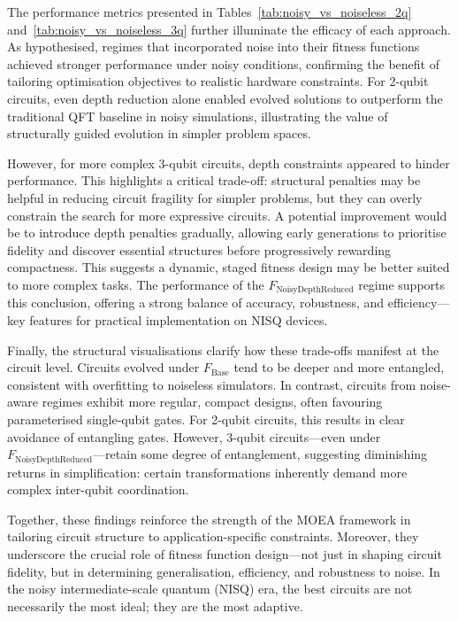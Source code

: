 \documentclass[11pt,a4paper]{article}
\begin{document}
The performance metrics presented in Tables~\ref{tab:noisy_vs_noiseless_2q} and~\ref{tab:noisy_vs_noiseless_3q} further illuminate the efficacy of each approach. As hypothesised, regimes that incorporated noise into their fitness functions achieved stronger performance under noisy conditions, confirming the benefit of tailoring optimisation objectives to realistic hardware constraints. For 2-qubit circuits, even depth reduction alone enabled evolved solutions to outperform the traditional QFT baseline in noisy simulations, illustrating the value of structurally guided evolution in simpler problem spaces.\newline

However, for more complex 3-qubit circuits, depth constraints appeared to hinder performance. This highlights a critical trade-off: structural penalties may be helpful in reducing circuit fragility for simpler problems, but they can overly constrain the search for more expressive circuits. A potential improvement would be to introduce depth penalties gradually, allowing early generations to prioritise fidelity and discover essential structures before progressively rewarding compactness. This suggests a dynamic, staged fitness design may be better suited to more complex tasks. The performance of the $F_{\mathrm{NoisyDepthReduced}}$ regime supports this conclusion, offering a strong balance of accuracy, robustness, and efficiency—key features for practical implementation on NISQ devices.\newline

Finally, the structural visualisations clarify how these trade-offs manifest at the circuit level. Circuits evolved under $F_{\mathrm{Base}}$ tend to be deeper and more entangled, consistent with overfitting to noiseless simulators. In contrast, circuits from noise-aware regimes exhibit more regular, compact designs, often favouring parameterised single-qubit gates. For 2-qubit circuits, this results in clear avoidance of entangling gates. However, 3-qubit circuits—even under $F_{\mathrm{NoisyDepthReduced}}$—retain some degree of entanglement, suggesting diminishing returns in simplification: certain transformations inherently demand more complex inter-qubit coordination.\newline

Together, these findings reinforce the strength of the MOEA framework in tailoring circuit structure to application-specific constraints. Moreover, they underscore the crucial role of fitness function design—not just in shaping circuit fidelity, but in determining generalisation, efficiency, and robustness to noise. In the noisy intermediate-scale quantum (NISQ) era, the best circuits are not necessarily the most ideal; they are the most adaptive.\newline
\end{document}
